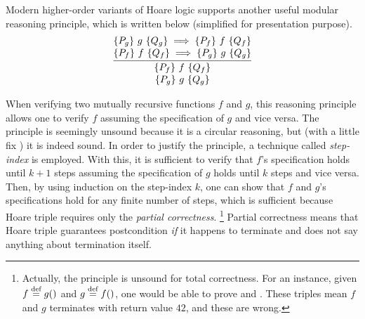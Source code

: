 Modern higher-order variants of Hoare logic\cite{VST,appel:plcc} supports another useful modular reasoning principle, which is written below (simplified for presentation purpose).%
\[
\infer
    {\deduce{\hoare{P_{g}}{g}{Q_{g}}}{\hoare{P_{f}}{f}{Q_{f}}}}
    {\deduce{\hoare{P_{f}}{f}{Q_{f}} \implies \hoare{P_{g}}{g}{Q_{g}}}
            {\hoare{P_{g}}{g}{Q_{g}} \implies \hoare{P_{f}}{f}{Q_{f}}}
    }
\]

\noindent When verifying two mutually recursive functions $f$ and $g$, this reasoning principle allows one to verify $f$ assuming the specification of $g$ and vice versa.
The principle is seemingly unsound because it is a circular reasoning, but (with a little fix %
) it is indeed sound. %
In order to justify the principle, a technique called {\it step-index} is employed.
With this, it is sufficient to verify that $f$'s specification holds until $k+1$ steps assuming the specification of $g$ holds until $k$ steps and vice versa.
Then, by using induction on the step-index $k$, one can show that $f$ and $g$'s specifications hold for any finite number of steps, which is sufficient because Hoare triple requires only the {\it partial correctness}.
\footnote{Actually, the principle is unsound for total correctness. For an instance, given $f \stackrel{\text{def}}{=} g()$ and $g \stackrel{\text{def}}{=} f()$, one would be able to prove  and .
  These triples mean $f$ and $g$ terminates with return value $42$, and these are wrong. }
Partial correctness means that Hoare triple guarantees postcondition {\it if} it happens to terminate and does not say anything about termination itself.





